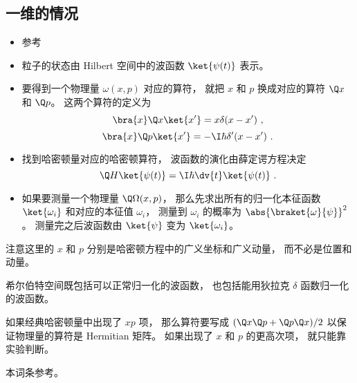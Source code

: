 
\begin{issues}
\issueDraft
\end{issues}



\subsection{一维的情况}
\begin{itemize}
\item 参考 \cite{Shankar}
\item 粒子的状态由 Hilbert 空间中的波函数 $\ket{\psi(t)}$ 表示。
\item 要得到一个物理量 $\omega(x, p)$ 对应的算符， 就把 $x$ 和 $p$ 换成对应的算符 $\Q x$ 和 $\Q p$。 这两个算符的定义为
\begin{equation}
\bra{x}\Q x \ket{x'} = x\delta(x-x')~,
\end{equation}
\begin{equation}
\bra{x}\Q p \ket{x'} = -\I\hbar \delta'(x-x')~.
\end{equation}
\item 找到哈密顿量对应的哈密顿算符， 波函数的演化由薛定谔方程决定
\begin{equation}
\Q H \ket{\psi(t)} = \I \hbar \dv{t} \ket{\psi(t)}~.
\end{equation}
\item 如果要测量一个物理量 $\Q\Omega(x, p)$， 那么先求出所有的归一化本征函数 $\ket{\omega_i}$ 和对应的本征值 $\omega_i$， 测量到 $\omega_i$ 的概率为 $\abs{\braket{\omega}{\psi}}^2$。 测量完之后波函数由 $\ket{\psi}$ 变为 $\ket{\omega_i}$。
\end{itemize}

注意这里的 $x$ 和 $p$ 分别是哈密顿方程中的广义坐标和广义动量， 而不必是位置和动量。

希尔伯特空间既包括可以正常归一化的波函数， 也包括能用狄拉克 $\delta$ 函数归一化的波函数。

如果经典哈密顿量中出现了 $xp$ 项， 那么算符要写成 $(\Q x \Q p + \Q p \Q x)/2$ 以保证物理量的算符是 Hermitian 矩阵。 如果出现了 $x$ 和 $p$ 的更高次项， 就只能靠实验判断。

本词条参考\cite{Shankar}。
